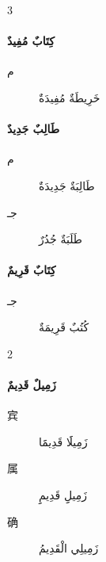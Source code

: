 \begin{Arabic}
    \begin{multicols}{3}
    \begin{minipage}{\linewidth}
    \paragraph{كِتَابٌ مُفِيدٌ}
    \begin{description}
        \item [م] خَرِيطَةٌ مُفِيدَةٌ
    \end{description}
    \end{minipage}

    \begin{minipage}{\linewidth}
    \paragraph{طَالِبٌ جَدِيدٌ}
    \begin{description}
        \item [م] طَالِبَةٌ جَدِيدَةٌ
        \item [جـ] طَلَبَةٌ جُدُرٌ
    \end{description}
    \end{minipage}

    \begin{minipage}{\linewidth}
    \paragraph{كِتَابٌ قَرِيمٌ}
    \begin{description}
        \item [جـ] كُتُبٌ قَرِيمَةٌ
    \end{description}
    \end{minipage}
    \end{multicols}

    \begin{multicols}{2}    
    \begin{minipage}{\linewidth}
    \paragraph{زَمِيلٌ قَدِيمٌ}
    \begin{description}
        \item [宾] زَمِيلََا قَدِيمََا
        \item [属] زَمِيلِِ قَدِيمِِ
        \item [确] زَمِيلِي الْقَدِيمُ
    \end{description}
    \end{minipage}


\end{multicols}
\end{Arabic}
